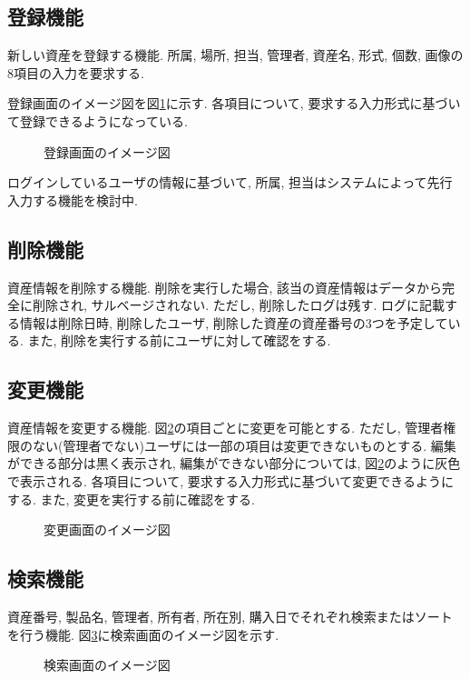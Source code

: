 \documentclass[11ptm]{jsarticle}
\begin{document}
\clearpage
\subsection{登録機能}
\label{subsec:登録機能}
新しい資産を登録する機能. 所属, 場所, 担当, 管理者, 資産名, 形式, 個数, 画像の8項目の入力を要求する. \par
登録画面のイメージ図を図\ref{fig:登録画面のイメージ図}に示す. 各項目について, 要求する入力形式に基づいて登録できるようになっている.
\begin{figure}[h]
  \centering
  \caption{\label{fig:登録画面のイメージ図}登録画面のイメージ図}
\end{figure}\par
ログインしているユーザの情報に基づいて, 所属, 担当はシステムによって先行入力する機能を検討中.

\subsection{削除機能}
\label{subsec:削除機能}
資産情報を削除する機能. 削除を実行した場合, 該当の資産情報はデータから完全に削除され, サルベージされない. ただし, 削除したログは残す. ログに記載する情報は削除日時, 削除したユーザ, 削除した資産の資産番号の3つを予定している. また, 削除を実行する前にユーザに対して確認をする.

\clearpage
\subsection{変更機能}
\label{subsec:変更機能}
資産情報を変更する機能. 図\ref{fig:変更画面のイメージ図}の項目ごとに変更を可能とする. ただし, 管理者権限のない(管理者でない)ユーザには一部の項目は変更できないものとする. 編集ができる部分は黒く表示され, 編集ができない部分については, 図\ref{fig:変更画面のイメージ図}のように灰色で表示される. 各項目について, 要求する入力形式に基づいて変更できるようにする. また, 変更を実行する前に確認をする.
\begin{figure}[h]
  \centering
  \caption{\label{fig:変更画面のイメージ図}変更画面のイメージ図}
\end{figure}

\clearpage
\subsection{検索機能}
\label{subsec:検索機能}
資産番号, 製品名, 管理者, 所有者, 所在別, 購入日でそれぞれ検索またはソートを行う機能. 図\ref{fig:検索画面のイメージ図}に検索画面のイメージ図を示す. 
\begin{figure}[h]
  \centering
  \caption{\label{fig:検索画面のイメージ図}検索画面のイメージ図}
\end{figure}
\end{document}
